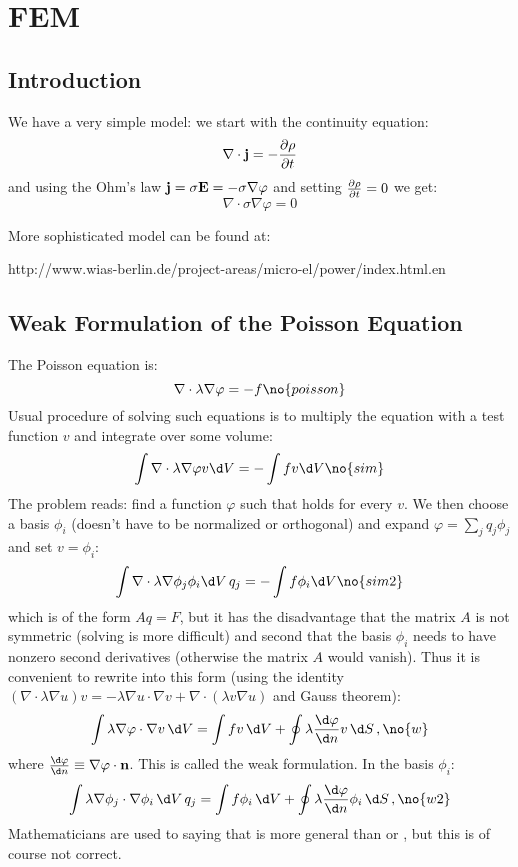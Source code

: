 \chapter{FEM}

\section{Introduction}

We have a very simple model: we start with the continuity equation:
$$\nabla\cdot{\bf j}=-{\partial\rho\over\partial t}$$
and using the Ohm's law ${\bf j}=\sigma{\bf E}=-\sigma\nabla\varphi$ and setting
${\partial\rho\over\partial t}=0$ we get:
$$\nabla\cdot\sigma\nabla\varphi=0$$

More sophisticated model can be found at:

http://www.wias-berlin.de/project-areas/micro-el/power/index.html.en

\section{Weak Formulation of the Poisson Equation}

The Poisson equation is:
$$\nabla\cdot\lambda\nabla\varphi=-f\no{poisson}$$
Usual procedure of solving such equations is to
multiply the equation with a test function $v$ and integrate over some
volume:
$$\int\nabla\cdot\lambda\nabla\varphi v \d V=-\int f v \d V\no{sim}$$
The problem reads: find a function $\varphi$ such that  holds for every
$v$. We then choose a basis $\phi_i$ (doesn't have to be normalized or
orthogonal) and expand $\varphi=\sum_j q_j \phi_j$ and set $v=\phi_i$:
$$\int\nabla\cdot\lambda\nabla\phi_j\phi_i \d V \, q_j=
-\int f \phi_i \d V\no{sim2}$$
which is of the form
$Aq=F$, but it has the disadvantage that the matrix $A$ is not symmetric
(solving is more difficult) and second that the basis $\phi_i$ needs to have
nonzero second derivatives (otherwise the matrix $A$ would vanish). Thus it is
convenient to rewrite  into this form (using the identity
$(\nabla\cdot\lambda\nabla u)v=-\lambda\nabla u \cdot \nabla v+
\nabla\cdot(\lambda v\nabla u)$
and Gauss theorem):
$$\int\lambda\nabla\varphi\cdot\nabla v\,\d V= \int fv\,\d V+
\oint\lambda{\d\varphi\over\d n}v\,\d S\,,\no{w}$$
where ${\d\varphi\over\d n}\equiv\nabla\varphi\cdot{\bf n}$. This is called
the weak formulation. In the basis $\phi_i$:
$$\int\lambda\nabla\phi_j\cdot\nabla \phi_i\,\d V\,q_j= \int f\phi_i\,\d V+
\oint\lambda{\d\varphi\over\d n}\phi_i\,\d S\,,\no{w2}$$
Mathematicians are used to saying that  is more general than
 or , but this is of course not correct.

